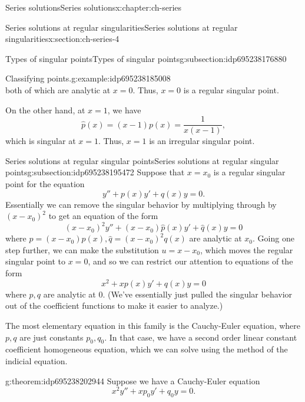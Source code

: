 \documentclass[oneside,10pt,]{book}
\numberwithin{equation}{section}
\numberwithin{equation}{section}
\begin{document}
\begin{chapterptx}{Series solutions}{}{Series solutions}{}{}{x:chapter:ch-series}
\begin{sectionptx}{Series solutions at regular singularities}{}{Series solutions at regular singularities}{}{}{x:section:ch-series-4}
\begin{subsectionptx}{Types of singular points}{}{Types of singular points}{}{}{g:subsection:idp695238176880}
\begin{example}{Classifying points.}{g:example:idp695238185008}
\begin{equation*}
\end{equation*}
both of which are analytic at \(x = 0\). Thus, \(x =0\) is a regular singular point.%
\par
On the other hand, at \(x = 1\), we have%
\begin{equation*}
\hat{p}(x) = (x - 1) p(x) = \frac{1}{x(x-1)},
\end{equation*}
which is singular at \(x = 1\). Thus, \(x =1\) is an irregular singular point.%
\end{example}
\end{subsectionptx}
%
%
\typeout{************************************************}
\typeout{************************************************}
%
\begin{subsectionptx}{Series solutions at regular singular points}{}{Series solutions at regular singular points}{}{}{g:subsection:idp695238195472}
Suppose that \(x = x_0\) is a regular singular point for the equation%
\begin{equation*}
y'' + p(x)y' + q(x)y = 0.
\end{equation*}
Essentially we can remove the singular behavior by multiplying through by \((x - x_0)^2\) to get an equation of the form%
\begin{equation*}
(x - x_0)^2 y'' + (x-x_0)\hat{p}(x) y' + \hat{q}(x) y = 0
\end{equation*}
where \(\hat{p} = (x-x_0)p(x), \hat{q} = (x - x_0)^2 q(x)\) are analytic at \(x_0\). Going one step further, we can make the substitution \(u = x - x_0\), which moves the regular singular point to \(x=0\), and so we can restrict our attention to equations of the form%
\begin{equation*}
x^2 + x p(x) y' + q(x) y = 0
\end{equation*}
where \(p, q\) are analytic at \(0\). (We've essentially just pulled the singular behavior out of the coefficient functions to make it easier to analyze.)%
\par
The most elementary equation in this family is the Cauchy-Euler equation, where \(p, q\) are just constants \(p_0, q_0\). In that case, we have a second order linear constant coefficient homogeneous equation, which we can solve using the method of the indicial equation.%
\begin{theorem}{}{}{g:theorem:idp695238202944}%
Suppose we have a Cauchy-Euler equation%
\begin{equation*}
x^2 y'' + x p_0 y' + q_0 y = 0.
\end{equation*}

\end{theorem}
\end{subsectionptx}
\end{sectionptx}
\end{chapterptx}
\end{document}
